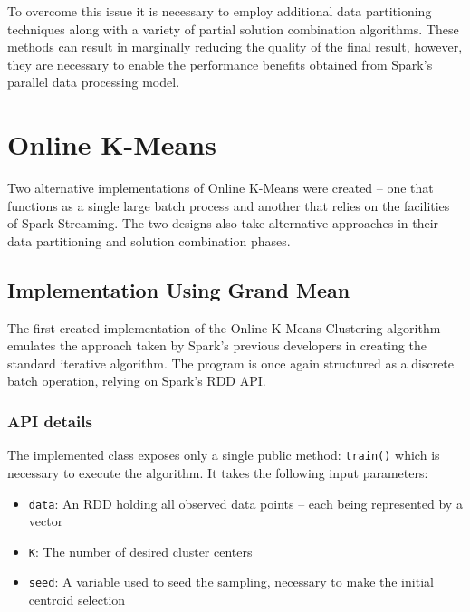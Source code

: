 \documentclass{l4proj}
\begin{document}
To overcome this issue it is necessary to employ additional data partitioning techniques along with a variety of partial solution combination algorithms. These methods can result in marginally reducing the quality of the final result, however, they are necessary to enable the performance benefits obtained from Spark's parallel data processing model.


\chapter{Online K-Means}
\label{online}

Two alternative implementations of Online K-Means were created -- one that functions as a single large batch process and another that relies on the facilities of Spark Streaming. The two designs also take alternative approaches in their data partitioning and solution combination phases.

\section{Implementation Using Grand Mean}

The first created implementation of the Online K-Means Clustering algorithm emulates the approach taken by Spark's previous developers in creating the standard iterative algorithm. The program is once again structured as a discrete batch operation, relying on Spark's RDD API.

\subsection{API details}

The implemented class exposes only a single public method: \texttt{train()} which is necessary to execute the algorithm. It takes the following input parameters:

\begin{itemize}
\item \texttt{data}: An RDD holding all observed data points -- each being represented by a vector
\item \texttt{K}: The number of desired cluster centers
\item \texttt{seed}: A variable used to seed the sampling, necessary to make the initial centroid selection
\end{itemize}
\end{document}
